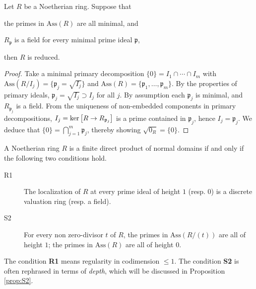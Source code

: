 \begin{lemma}\label{prop:reduced-test}
	Let $R$ be a Noetherian ring. Suppose that
	\begin{compactitem}
		\item the primes in $\mathrm{Ass}(R)$ are all minimal, and
		\item $R_{\mathfrak{p}}$ is a field for every minimal prime ideal $\mathfrak{p}$,
	\end{compactitem}
	then $R$ is reduced.
\end{lemma}
\begin{proof}
	Take a minimal primary decomposition $\{0\} = I_1 \cap \cdots \cap I_m$ with $\text{Ass}(R/I_j) = \{\mathfrak{p}_j = \sqrt{I_j} \}$ and $\text{Ass}(R) = \{\mathfrak{p}_1, \ldots, \mathfrak{p}_m \}$. By the properties of primary ideals, $\mathfrak{p}_j = \sqrt{I_j} \supset I_j$ for all $j$. By assumption each $\mathfrak{p}_j$ is minimal, and $R_{\mathfrak{p}_j}$ is a field. From the uniqueness of non-embedded components in primary decompositions, $I_j = \operatorname{ker}\left[R \to R_{\mathfrak{p}_j}\right]$ is a prime contained in $\mathfrak{p}_j$, hence $I_j = \mathfrak{p}_j$. We deduce that $\{0\} = \bigcap_{j=1}^m \mathfrak{p}_j$, thereby showing $\sqrt{0_R} = \{0\}$.
\end{proof}

\begin{theorem}[J.-P. Serre]\label{prop:Serre-criterion}
	A Noetherian ring $R$ is a finite direct product of normal domains if and only if the following two conditions hold.
	\begin{description}
		\item[R1] The localization of $R$ at every prime ideal of height $1$ (resp. $0$) is a discrete valuation ring (resp. a field).
		\item[S2] For every non zero-divisor $t$ of $R$, the primes in $\mathrm{Ass}(R/(t))$ are all of height $1$; the primes in $\mathrm{Ass}(R)$ are all of height $0$.
	\end{description}
\end{theorem}
The condition \textbf{R1} means regularity in codimension $\leq 1$. The condition \textbf{S2} is often rephrased in terms of \emph{depth}, which will be discussed in Proposition \ref{prop:S2}.

